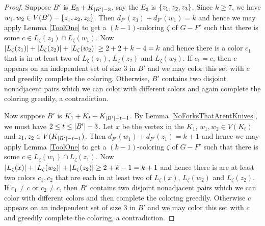 \begin{proof}
Suppose $B'$ is $E_3 \mbox{\hspace{2 pt}$+$\hspace{2 pt}} K_{\left|B'\right| - 3}$, say the $E_3$ is
$\left\{ z_1, z_2, z_3 \right\}$.  Since $k \geq 7$, we have $w_1, w_2 \in V(B') -
\left\{ z_1, z_2, z_3 \right\}$. Then $d_{F'}(z_3) + d_{F'}(w_1) = k$ and hence we may
apply Lemma \ref{ToolOne} to get a $(k - 1)$-coloring $\zeta$ of $G - F'$ such
that there is some $c \in L_\zeta(z_3) \cap L_\zeta(w_1)$.  Now $\left|L_\zeta(z_1)\right| +
\left|L_\zeta(z_2)\right| + \left|L_\zeta(w_2)\right| \geq 2 + 2 + k - 4 = k$ and hence
there is a color $c_1$ that is in at least two of 
$L_\zeta(z_1)$, $L_\zeta(z_2)$ and $L_\zeta(w_2)$.  If $c_1 = c$, then $c$
appears on an independent set of size $3$ in $B'$ and we may color this set
with $c$ and greedily complete the coloring. Otherwise, $B'$ contains two
disjoint nonadjacent pairs which we can color with different colors and again
complete the coloring greedily, a contradiction.

Now suppose $B'$ is $K_1 \mbox{\hspace{2 pt}$+$\hspace{2 pt}} K_t \mbox{\hspace{2 pt}$+$\hspace{2 pt}} K_{\left|B'\right| -
t - 1}$.  By Lemma \ref{NoForksThatArentKnives}, we must have $2 \leq t \leq
\left|B'\right| - 3$. Let $x$ be the vertex in the $K_1$, $w_1, w_2 \in V(K_t)$ and
$z_1, z_2 \in V(K_{\left|B'\right| - t - 1})$.  Then $d_{F'}(w_1) + d_{F'}(z_1) = k
+ 1$ and hence we may apply Lemma \ref{ToolOne} to get a $(k - 1)$-coloring
$\zeta$ of $G - F'$ such that there is some $c \in L_\zeta(w_1) \cap
L_\zeta(z_1)$.  Now $\left|L_\zeta(x)\right| +
\left|L_\zeta(w_2)\right| + \left|L_\zeta(z_2)\right| \geq 2 + k-1 = k+1$ and hence
there is are at least two colors $c_1, c_2$ that are each in at least two of 
$L_\zeta(x)$, $L_\zeta(w_2)$ and $L_\zeta(z_2)$.  If $c_1 \neq c$ or $c_2 \neq
c$, then $B'$ contains two
disjoint nonadjacent pairs which we can color with different colors and
then complete the coloring greedily.  Otherwise $c$
appears on an independent set of size $3$ in $B'$ and we may color this set
with $c$ and greedily complete the coloring, a contradiction.


\end{proof}
